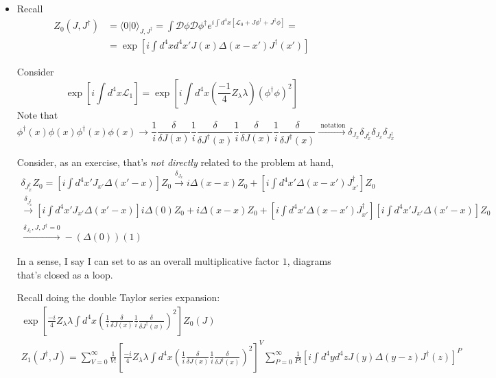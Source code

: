 \documentclass[twoside]{amsart}
\newcommand{\solutionhead}[1]
  {\smallskip
   \noindent{\large\bf Solution #1.}
   }
\begin{document}
\solutionhead{9.3} 
\begin{itemize}
\item[(a)]Recall
\[
\begin{aligned}
  Z_0(J,J^{\dag}) & = \langle 0 | 0 \rangle_{J,J^{\dag}} = \int \mathcal{D}\phi \mathcal{D}\phi^{\dag} e^{i \int d^4x [ \mathcal{L}_0 + J \phi^{\dag} + J^{\dag} \phi ]} = \\
  & = \exp{ [ i \int d^4x d^4x' J(x) \Delta(x-x') J^{\dag}(x')]}
\end{aligned}
\]

Consider 
\[
\exp{ \left[ i \int d^4x \mathcal{L}_1 \right]} = \exp{ \left[ i \int d^4x \left( \frac{-1}{4} Z_{\lambda} \lambda \right) (\phi^{\dag} \phi)^2 \right]}
\]
Note that
\[
\phi^{\dag}(x) \phi(x) \phi^{\dag}(x) \phi(x) \rightarrow \frac{1}{i} \frac{\delta}{\delta J(x) } \frac{1}{i}\frac{ \delta}{ \delta J^{\dag}(x)} \frac{1}{i}\frac{ \delta}{ \delta J(x)} \frac{1}{i}\frac{ \delta}{ \delta J^{\dag}(x)} \xrightarrow{ \text{ notation}} \delta_{J_x} \delta_{J_x^{\dag}} \delta_{J_x} \delta_{J^{\dag}_x}
\]

\hrulefill

Consider, as an exercise, that's \emph{not directly} related to the problem at hand,
\[
\begin{gathered}
  \delta_{J_x^{\dag}} Z_0 = [ i \int d^4x' J_{x'} \Delta(x'-x)]Z_0 \xrightarrow{ \delta_{J_x}} i \Delta(x-x)Z_0 + [i \int d^4x' \Delta(x-x') J_{x'}^{\dag}] Z_0 \\ 
  \xrightarrow{ \delta_{J_x^{\dag}}} [ i \int d^4x' J_{x'} \Delta(x'-x) ]i \Delta(0) Z_0 + i \Delta(x-x) Z_0 + [i\int d^4x' \Delta(x-x') J_{x'}^{\dag}] [i \int d^4x' J_{x'} \Delta(x'-x)]Z_0 \\
  \xrightarrow{ \delta_{J_x}, J,J^{\dag} =0} -(\Delta (0))(1)
\end{gathered}
\]

In a sense, I say I can set to as an overall multiplicative factor $1$, diagrams that's closed as a loop.  

\hrulefill

Recall doing the double Taylor series expansion:
\[
\begin{gathered}
  \exp{ \left[ \frac{-i}{4} Z_{\lambda} \lambda \int d^4 x\left( \frac{1}{i} \frac{ \delta}{ \delta J(x)} \frac{1}{i} \frac{\delta}{\delta J^{\dag}(x)} \right)^2 \right] } Z_0(J) \\
  Z_1(J^{\dag},J) = \sum_{V=0}^{\infty} \frac{1}{V!} \left[ \frac{-i}{4} Z_{\lambda} \lambda \int d^4x \left( \frac{1}{i} \frac{\delta}{\delta J(x)} \frac{1}{i} \frac{ \delta }{ \delta J^{\dag}(x) } \right)^2 \right]^V  \sum_{P=0}^{\infty} \frac{1}{P!} \left[ i \int d^4y d^4z J(y) \Delta(y-z) J^{\dag}(z) \right]^P
\end{gathered}
\]


\end{itemize}
\end{document}
